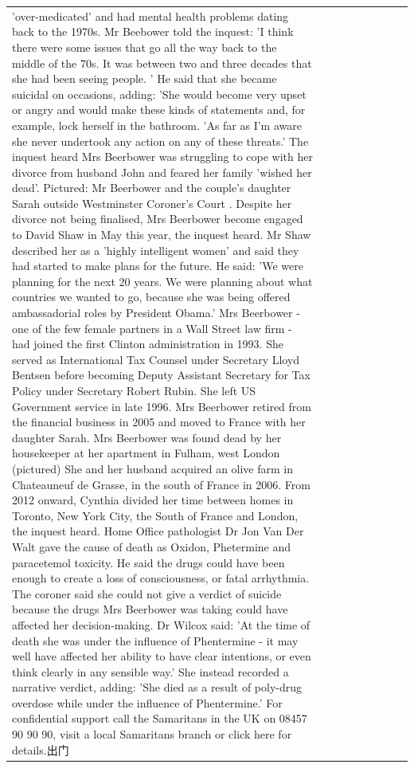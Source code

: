 \begin{table}[H]
\begin{tabular}{lllrlllll}
'over-medicated' and had mental health problems dating back to the 1970s. Mr Beebower told the inquest: 'I think there were some issues that go all the way back to the middle of the 70s. It was between two and three decades that she had been seeing people. ' He said that she became suicidal on occasions, adding: 'She would become very upset or angry and would make these kinds of statements and, for example, lock herself in the bathroom. 'As far as I'm aware she never undertook any action on any of these threats.' The inquest heard Mrs Beerbower was struggling to cope with her divorce from husband John and feared her family 'wished her dead'. Pictured: Mr Beerbower and the couple's daughter Sarah outside Westminster Coroner's Court . Despite her divorce not being finalised, Mrs Beerbower become engaged to David Shaw in May this year, the inquest heard. Mr Shaw described her as a 'highly intelligent women' and said they had started to make plans for the future. He said: 'We were planning for the next 20 years. We were planning about what countries we wanted to go, because she was being offered ambassadorial roles by President Obama.' Mrs Beerbower - one of the few female partners in a Wall Street law firm - had joined the first Clinton administration in 1993. She served as International Tax Counsel under Secretary Lloyd Bentsen before becoming Deputy Assistant Secretary for Tax Policy under Secretary Robert Rubin. She left US Government service in late 1996. Mrs Beerbower retired from the financial business in 2005 and moved to France with her daughter Sarah. Mrs Beerbower was found dead by her housekeeper at her apartment in Fulham, west London (pictured) She and her husband acquired an olive farm in Chateauneuf de Grasse, in the south of France in 2006. From 2012 onward, Cynthia divided her time between homes in Toronto, New York City, the South of France and London, the inquest heard. Home Office pathologist Dr Jon Van Der Walt gave the cause of death as Oxidon, Phetermine and paracetemol toxicity. He said the drugs could have been enough to create a loss of consciousness, or fatal arrhythmia. The coroner said she could not give a verdict of suicide because the drugs Mrs Beerbower was taking could have affected her decision-making. Dr Wilcox said: 'At the time of death she was under the influence of Phentermine - it may well have affected her ability to have clear intentions, or even think clearly in any sensible way.' She instead recorded a narrative verdict, adding: 'She died as a result of poly-drug overdose while under the influence of Phentermine.' For confidential support call the Samaritans in the UK on 08457 90 90 90, visit a local Samaritans branch or click here for details.出门 \\

\end{tabular}
\end{table}
